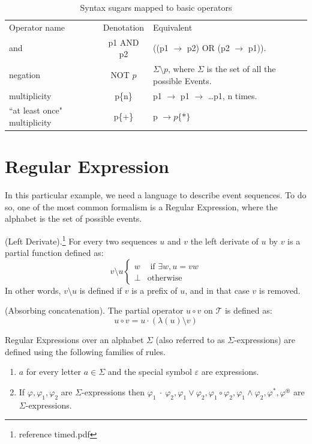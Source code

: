 		\begin{table}
		\caption{Syntax sugars mapped to basic operators}		
		\label{tab:cep:veplsugartobasic}
		\begin{tabular}{lcm{6cm}}
		\centering
		Operator name &	Denotation & Equivalent \\
		and &	p1 AND p2 & ((p1 $\rightarrow$ p2) OR (p2 $\rightarrow$ p1)). \\
		negation &	NOT $p$ & $\Sigma \setminus p$, where $\Sigma$ is the set of all the possible Events. \\
		multiplicity &	p\{n\} &	p1 $\rightarrow$ p1 $\rightarrow$ \dots p1, n times. \\
		``at least once" multiplicity &	p\{+\} & p $\rightarrow p\{\ast\}$ \\
		\end{tabular}
		\end{table}

		
	\section{Regular Expression}
		In this particular example, we need a language to describe event sequences. To do so, one of the most common
		formalism is a Regular Expression, where the alphabet is the set of possible events.
		
		\begin{dfn}
			(Left Derivate).\footnote{reference timed.pdf}
			For every two sequences $u$ and $v$ the left derivate of $u$ by $v$
			is a partial function defined as:
			\[ v \setminus u
				\begin{cases}
					w & \text{ if } \exists w,u = vw \\
					\perp & \text{otherwise}
				\end{cases}
			\]
			In other words, $v \setminus u$ is defined if $v$ is a prefix of $u$,
			and in that case $v$ is removed.
		\end{dfn}
		
		\begin{dfn}
			(Absorbing concatenation).
			The partial operator $u \circ v$ on $\mathcal{T}$ is defined as:
			\[ u \circ v = u \cdot (\lambda (u) \setminus v) \]
		\end{dfn}
		
		\begin{dfn}
			\label{dfn:cep:re}
			Regular Expressions over an alphabet $\Sigma$ (also referred to as $\Sigma$-expressions)
			are defined using the following families of rules.
			\begin{enumerate}
				\item \underline{$a$} for every letter $a \in \Sigma$ and the special symbol $\varepsilon$ are expressions.
				\item If $\varphi, \varphi_1, \varphi_2$ are $\Sigma$-expressions then %
					$ %
					\varphi_1~\cdot~\varphi_2,
					\varphi_1 \vee \varphi_2,
					\varphi_1 \circ \varphi_2,
					\varphi_1 \wedge \varphi_2,
					\varphi^\ast,
					\varphi^\circledast
					$ are $\Sigma$-expressions.
			\end{enumerate}
		\end{dfn}
		
